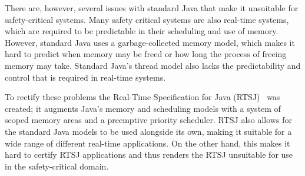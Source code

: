 There are, however, several issues with standard Java that make it
unsuitable for safety-critical systems.
Many safety critical systems are also real-time systems, which are
required to be predictable in their scheduling and use of memory.
However, standard Java uses a garbage-collected memory model, which
makes it hard to predict when memory may be freed or how long the
process of freeing memory may take.
Standard Java's thread model also lacks the predictability and control
that is required in real-time systems.

To rectify these problems the Real-Time Specification for Java
(RTSJ)~\cite{gosling2000} was created; it augments Java's memory and
scheduling models with a system of scoped memory areas and a
preemptive priority scheduler.
RTSJ also allows for the standard Java models to be used alongside its
own, making it suitable for a wide range of different real-time
applications.
On the other hand, this makes it hard to certify RTSJ applications and
thus renders the RTSJ unsuitable for use in the safety-critical
domain.

